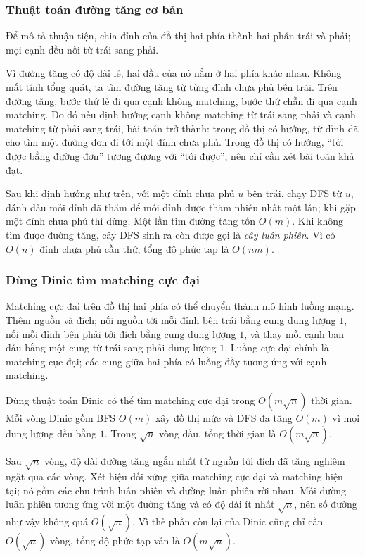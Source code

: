 \documentclass[11pt]{article}
\begin{document}
\subsubsection{Thuật toán đường tăng cơ bản}

Để mô tả thuận tiện, chia đỉnh của đồ thị hai phía thành hai phần trái và phải;
mọi cạnh đều nối từ trái sang phải.

Vì đường tăng có độ dài lẻ, hai đầu của nó nằm ở hai phía khác nhau. Không mất
tính tổng quát, ta tìm đường tăng từ từng đỉnh chưa phủ bên trái. Trên đường
tăng, bước thứ lẻ đi qua cạnh không matching, bước thứ chẵn đi qua cạnh
matching. Do đó nếu định hướng cạnh không matching từ trái sang phải và cạnh
matching từ phải sang trái, bài toán trở thành: trong đồ thị có hướng, từ đỉnh
đã cho tìm một đường đơn đi tới một đỉnh chưa phủ. Trong đồ thị có hướng, ``tới
được bằng đường đơn'' tương đương với ``tới được'', nên chỉ cần xét bài toán khả
đạt.

Sau khi định hướng như trên, với một đỉnh chưa phủ \(u\) bên trái, chạy DFS từ
\(u\), đánh dấu mỗi đỉnh đã thăm để mỗi đỉnh được thăm nhiều nhất một lần; khi
gặp một đỉnh chưa phủ thì dừng. Một lần tìm đường tăng tốn \(O(m)\). Khi không
tìm được đường tăng, cây DFS sinh ra còn được gọi là \emph{cây luân phiên}. Vì
có \(O(n)\) đỉnh chưa phủ cần thử, tổng độ phức tạp là \(O(nm)\).

\subsubsection{Dùng Dinic tìm matching cực đại}

Matching cực đại trên đồ thị hai phía có thể chuyển thành mô hình luồng mạng.
Thêm nguồn và đích; nối nguồn tới mỗi đỉnh bên trái bằng cung dung lượng \(1\),
nối mỗi đỉnh bên phải tới đích bằng cung dung lượng \(1\), và thay mỗi cạnh ban
đầu bằng một cung từ trái sang phải dung lượng \(1\). Luồng cực đại chính là
matching cực đại; các cung giữa hai phía có luồng đầy tương ứng với cạnh
matching.

Dùng thuật toán Dinic có thể tìm matching cực đại trong \(O(m\sqrt n)\) thời
gian. Mỗi vòng Dinic gồm BFS \(O(m)\) xây đồ thị mức và DFS đa tăng \(O(m)\) vì
mọi dung lượng đều bằng \(1\). Trong \(\sqrt n\) vòng đầu, tổng thời gian là
\(O(m\sqrt n)\).

Sau \(\sqrt n\) vòng, độ dài đường tăng ngắn nhất từ nguồn tới đích đã tăng
nghiêm ngặt qua các vòng. Xét hiệu đối xứng giữa matching cực đại và matching
hiện tại; nó gồm các chu trình luân phiên và đường luân phiên rời nhau. Mỗi
đường luân phiên tương ứng với một đường tăng và có độ dài ít nhất \(\sqrt n\),
nên số đường như vậy không quá \(O(\sqrt n)\). Vì thế phần còn lại của Dinic
cũng chỉ cần \(O(\sqrt n)\) vòng, tổng độ phức tạp vẫn là \(O(m\sqrt n)\).
\end{document}
